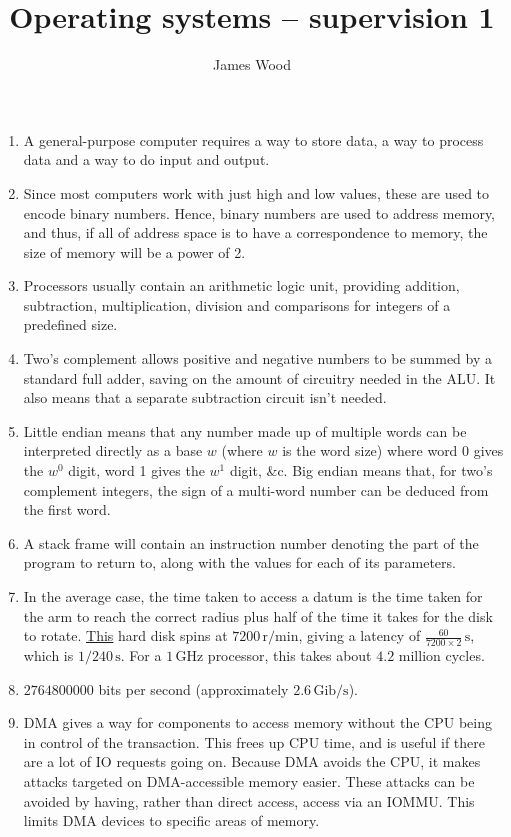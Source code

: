 \documentclass[11pt]{article}
\title{\textbf{Operating systems -- supervision 1}}
\author{James Wood}
\begin{document}
\renewcommand{\labelenumi}{(\arabic{enumi})}
\renewcommand{\labelenumii}{(\alph{enumi})}
\renewcommand{\labelenumiii}{(\roman{enumii})}

\maketitle

\begin{enumerate}
\item A general-purpose computer requires a way to store data, a way to process data and a way to do input and output.
\item Since most computers work with just high and low values, these are used to encode binary numbers. Hence, binary numbers are used to address memory, and thus, if all of address space is to have a correspondence to memory, the size of memory will be a power of 2.
\item Processors usually contain an arithmetic logic unit, providing addition, subtraction, multiplication, division and comparisons for integers of a predefined size.
\item Two's complement allows positive and negative numbers to be summed by a standard full adder, saving on the amount of circuitry needed in the ALU. It also means that a separate subtraction circuit isn't needed.
\item Little endian means that any number made up of multiple words can be interpreted directly as a base \(w\) (where \(w\) is the word size) where word 0 gives the \(w^0\) digit, word 1 gives the \(w^1\) digit, \&c. Big endian means that, for two's complement integers, the sign of a multi-word number can be deduced from the first word.
\item A stack frame will contain an instruction number denoting the part of the program to return to, along with the values for each of its parameters.
\item In the average case, the time taken to access a datum is the time taken for the arm to reach the correct radius plus half of the time it takes for the disk to rotate. \href{http://www.amazon.co.uk/Generic-Hard-Disk-Drive-500GB/dp/B000OUF6OQ/ref=pd_sxp_f_pt}{This} hard disk spins at \(7200\,\mathrm{r/min}\), giving a latency of \(\frac{60}{7200\times 2}\,\mathrm{s}\), which is \(1/240\,\mathrm{s}\). For a \(1\,\mathrm{GHz}\) processor, this takes about \(4.2\) million cycles.
\item \(2764800000\) bits per second (approximately \(2.6\,\mathrm{Gib/s}\)).
\item DMA gives a way for components to access memory without the CPU being in control of the transaction. This frees up CPU time, and is useful if there are a lot of IO requests going on. Because DMA avoids the CPU, it makes attacks targeted on DMA-accessible memory easier. These attacks can be avoided by having, rather than direct access, access via an IOMMU. This limits DMA devices to specific areas of memory.

\end{enumerate}
\end{document}
